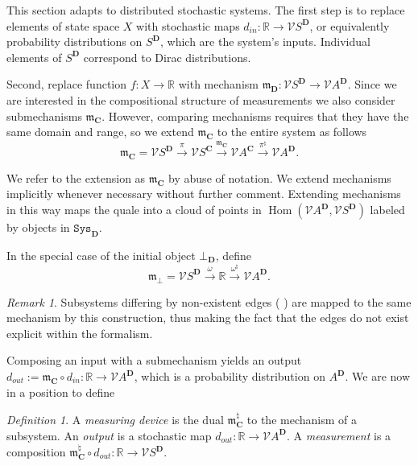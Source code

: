 \documentclass[12pt]{article}
\DeclareMathOperator{\Hom}{Hom}
\newcommand{\vecify}{{\mathcal V}}
\newcommand{\Act}{{A}}
\newcommand{\Sit}{{S}}
\newcommand{\univ}{{\mathbf D}}
\newcommand{\uout}{{d_{out}}}
\newcommand{\uin}{{d_{in}}}
\newcommand{\mangle}{{\mathbf C}}
\newcommand{\subs}{{\mathtt{Sys}}}
\newcommand{\bR}{{\mathbb R}}
\newcommand{\fm}{{\mathfrak m}}
\theoremstyle{remark}
\newtheorem{rem}{Remark}
\newtheorem{defn}{Definition}
\begin{document}
This section adapts %
to distributed 
stochastic systems. The first step is to replace elements of 
state space $X$ with stochastic maps $\uin:\bR\rightarrow 
\vecify\Sit^\univ$, or equivalently probability distributions 
on $\Sit^\univ$, which are the system's inputs. Individual 
elements of $\Sit^\univ$ correspond to Dirac distributions. 

Second, replace function $f:X\rightarrow \bR$ with mechanism 
$\fm_\univ:\vecify\Sit^\univ\rightarrow \vecify\Act^\univ$. 
Since we are interested in the compositional structure of 
measurements we also consider submechanisms $\fm_\mangle$. 
However, comparing mechanisms requires that they have the same 
domain and range, so we extend $\fm_\mangle$ to the entire 
system as follows
\begin{equation}
    \label{e:extension}
	\fm_\mangle = \vecify \Sit^\univ\xrightarrow{\pi}
    \vecify\Sit^\mangle\xrightarrow{\fm_\mangle}
    \vecify \Act^\mangle\xrightarrow{\pi^\natural}
    \vecify \Act^\univ.
\end{equation}

We refer to the extension as $\fm_\mangle$ by abuse of notation.
We extend mechanisms implicitly whenever necessary without 
further comment. Extending mechanisms in this way maps the 
quale into a cloud of points in $\Hom(\vecify \Act^\univ,
\vecify\Sit^\univ)$ labeled by objects in $\subs_\univ$.

In the special case of the initial object $\bot_\univ$, define 
\begin{equation*}
		\label{e:null-extension}
	\fm_\bot = \vecify \Sit^\univ\xrightarrow{\omega}
    \bR\xrightarrow{\omega^\natural}\vecify \Act^\univ.
\end{equation*}
\begin{rem}
	\label{r:same-point}
	Subsystems differing by non-existent edges (%
    ) 
    are mapped to the same mechanism by this construction, thus 
    making the fact that the edges do not exist explicit within 
    the formalism.
\end{rem}

Composing an input with a submechanism yields an output 
$\uout:=\fm_\mangle\circ \uin: \bR\rightarrow 
\vecify \Act^\univ$, which is a probability distribution on 
$\Act^\univ$. We are now in a position to define

\begin{defn}
	\label{d:stochmeas}
	A \emph{measuring device} is the dual $\fm^\natural_\mangle$
    to the mechanism of a subsystem. An \emph{output} is a 
    stochastic map $\uout:\bR\rightarrow \vecify\Act^\univ$. A 
    \emph{measurement} is a composition $\fm^\natural_\mangle
    \circ \uout:\bR\rightarrow \vecify\Sit^\univ$.
\end{defn}
\end{document}
